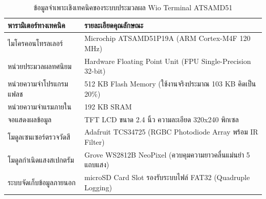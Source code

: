 \begin{table}[H]
\centering
\caption{ข้อมูลจำเพาะเชิงเทคนิคของระบบประมวลผล Wio Terminal ATSAMD51}
\label{tab:appendix_specs}
\begin{tabularx}{\textwidth}{p{4.5cm}X}
\toprule
\textbf{พารามิเตอร์ทางเทคนิค} & \textbf{รายละเอียดคุณลักษณะ} \\
\midrule
ไมโครคอนโทรลเลอร์ & Microchip ATSAMD51P19A (ARM Cortex-M4F 120 MHz) \\
หน่วยประมวลผลทศนิยม & Hardware Floating Point Unit (FPU Single-Precision 32-bit) \\
หน่วยความจำโปรแกรมแฟลช & 512 KB Flash Memory (ใช้งานจริงประมาณ 103 KB คิดเป็น 20\%) \\
หน่วยความจำแรมภายใน & 192 KB SRAM \\
จอแสดงผลข้อมูล & TFT LCD ขนาด 2.4 นิ้ว ความละเอียด 320x240 พิกเซล \\
โมดูลเซนเซอร์ตรวจวัดสี & Adafruit TCS34725 (RGBC Photodiode Array พร้อม IR Filter) \\
โมดูลกำเนิดแสงสเปกตรัม & Grove WS2812B NeoPixel (ควบคุมความยาวคลื่นแม่นยำ 5 แถบแสง) \\
ระบบจัดเก็บข้อมูลภายนอก & microSD Card Slot รองรับระบบไฟล์ FAT32 (Quadruple Logging) \\
\bottomrule
\end{tabularx}
\end{table}
